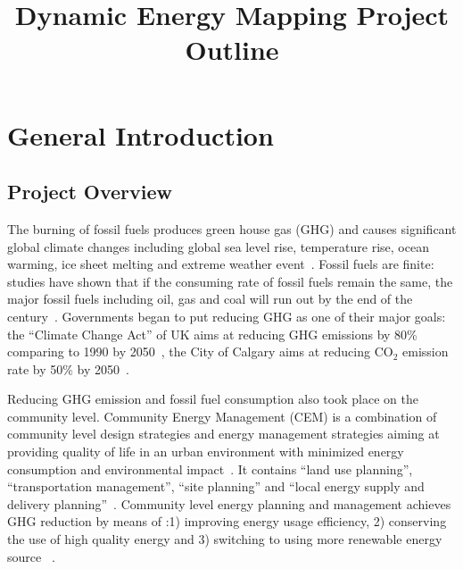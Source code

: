 \documentclass[hidelinks,12pt]{article}
\begin{document}
\title{Dynamic Energy Mapping Project Outline}
\maketitle
\tableofcontents
\newpage
\section{General Introduction}
\subsection{Project Overview}
\begin{comment}
Buildings alone account for 40\% of the total energy usage in the
United States. However if the indirect energy impact of the built
environment as a whole was considered, the community design induced
energy and environmental impact could exceed this already high ratio:
60\% - 75\% of the energy consumption is connected to the spatial
layout of built environment~\cite{Owens199281}. In a broader sense,
the energy resources distribution influences the layout of human
activities~\cite{Owens199281}. In a more restrict sense, built
environment influence the community energy throughput by its density,
degree of land use mix, energy supply infrastructure and
transportation network ~\cite{Jaccard19971065}.
\end{comment}

The burning of fossil fuels produces green house gas (GHG) and causes
significant global climate changes including global sea level rise,
temperature rise, ocean warming, ice sheet melting and extreme weather
event~\cite{NASA2015}. Fossil fuels are finite: studies have shown
that if the consuming rate of fossil fuels remain the same, the major
fossil fuels including oil, gas and coal will run out by the end of
the century~\cite{Ecotricity2015, Kathryn2015}. Governments began to
put reducing GHG as one of their major goals: the ``Climate Change
Act'' of UK aims at reducing GHG emissions by 80\% comparing to 1990
by 2050~\cite{carbonBudgetUK}, the City of Calgary aims at reducing
CO$_2$ emission rate by 50\% by 2050~\cite{aacip2009}. 

Reducing GHG emission and fossil fuel consumption also took place on
the community level. Community Energy Management (CEM) is a
combination of community level design strategies and energy management
strategies aiming at providing quality of life in an urban environment
with minimized energy consumption and environmental
impact~\cite{Jaccard19971065}. It contains ``land use planning'',
``transportation management'', ``site planning'' and ``local energy
supply and delivery planning''~\cite{Jaccard19971065}. Community level
energy planning and management achieves GHG reduction by means of :1)
improving energy usage efficiency, 2) conserving the use of high
quality energy and 3) switching to using more renewable energy source
~\cite{StDenis20092088}. 
\end{document}
